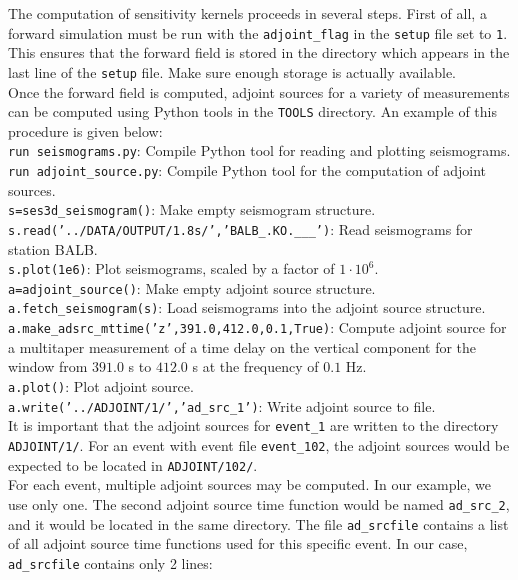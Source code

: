 The computation of sensitivity kernels proceeds in several steps. First of all, a forward simulation must be run with the \texttt{adjoint\_flag} in the \texttt{setup} file set to \texttt{1}. This ensures that the forward field is stored in the directory which appears in the last line of the \texttt{setup} file. Make sure enough storage is actually available.\\
Once the forward field is computed, adjoint sources for a variety of measurements can be computed using Python tools in the \texttt{TOOLS} directory. An example of this procedure is given below:\\[5pt]
\texttt{run seismograms.py}: Compile Python tool for reading and plotting seismograms.\\[5pt]
\texttt{run adjoint\_source.py}: Compile Python tool for the computation of adjoint sources.\\[5pt]
\texttt{s=ses3d\_seismogram()}: Make empty seismogram structure.\\[5pt]
\texttt{s.read('../DATA/OUTPUT/1.8s/','BALB\_.KO.\_\_\_')}: Read seismograms for station BALB.\\[5pt]
\texttt{s.plot(1e6)}: Plot seismograms, scaled by a factor of $1\cdot 10^6$.\\[5pt]
\texttt{a=adjoint\_source()}: Make empty adjoint source structure.\\[5pt]
\texttt{a.fetch\_seismogram(s)}: Load seismograms into the adjoint source structure.\\[5pt]
\texttt{a.make\_adsrc\_mttime('z',391.0,412.0,0.1,True)}: Compute adjoint source for a multitaper measurement of a time delay on the vertical component for the window from $391.0$ s to $412.0$ s at the frequency of $0.1$ Hz.\\[5pt]
\texttt{a.plot()}: Plot adjoint source.\\[5pt]
\texttt{a.write('../ADJOINT/1/','ad\_src\_1')}: Write adjoint source to file.\\[5pt]
It is important that the adjoint sources for \texttt{event\_1} are written to the directory \texttt{ADJOINT/1/}. For an event with event file \texttt{event\_102}, the adjoint sources would be expected to be located in \texttt{ADJOINT/102/}.\\
For each event, multiple adjoint sources may be computed. In our example, we use only one. The second adjoint source time function would be named \texttt{ad\_src\_2}, and it would be located in the same directory. The file \texttt{ad\_srcfile} contains a list of all adjoint source time functions used for this specific event. In our case, \texttt{ad\_srcfile} contains only 2 lines:\\[7pt]
